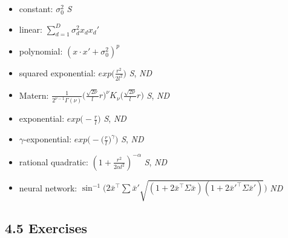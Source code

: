 \documentclass[
]{article}
\begin{document}
\begin{itemize}
\item
  constant: \(\sigma_0^2\) \emph{S}
\item
  linear: \(\sum^D_{d=1}\sigma^2_dx_dx_d'\)
\item
  polynomial: \((x \cdot x' + \sigma_0^2)^p\)
\item
  squared exponential: \(exp\Big( \frac {r^2} {2l^2} \Big)\) \emph{S},
  \emph{ND}
\item
  Matern:
  \(\frac 1 {2^{\nu-1}\Gamma (\nu)} \Big(\frac {\sqrt{2\nu}} {l} r\Big)^\nu K_\nu \Big(\frac {\sqrt{2\nu}} {l} r\Big)\)
  \emph{S}, \emph{ND}
\item
  exponential: \(exp\Big(- \frac r l\Big)\) \emph{S}, \emph{ND}
\item
  \(\gamma\)-exponential: \(exp \Big(-\big(\frac r l\big)^\gamma \Big)\)
  \emph{S}, \emph{ND}
\item
  rational quadratic: \((1 + \frac {r^2} {2\alpha l^2})^{-\alpha}\)
  \emph{S}, \emph{ND}
\item
  neural network:
  \(\sin^{-1} \Big( {2\bar x^{\top}\sum\bar x'} {\sqrt{(1+2\bar x^{\top}\Sigma\bar x)(1+2\bar x'^{\top}\Sigma\bar x')}} \Big)\)
  \emph{ND}
\end{itemize}

\hypertarget{exercises}{%
\subsection{4.5 Exercises}\label{exercises}}
\end{document}
